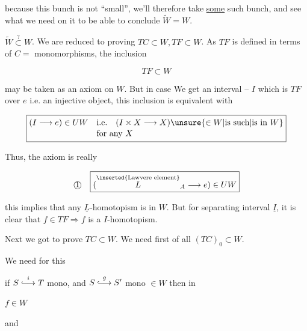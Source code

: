 

because this bunch is not ``small'', we'll therefore take \uline{some} such bunch, and see what we need on it to be able to conclude $\widetilde W=W$.

$\widetilde W\overset{?}{\subset}W$. We are reduced to proving $TC\subset W,TF\subset W$. As $TF$ is defined in terms of $C={}$ monomorphisms, the inclusion

\[\boxed{TF\subset W}\]

may be taken as an axiom on $W$. But in case We get an  interval -- $I$ which is $TF$ over $e$ i.e. an injective object,  this inclusion is equivalent with

\[\boxed{\begin{aligned}
(I\longrightarrow e)\in UW\quad&\text{i.e.}\quad(I\times X\longrightarrow X)\unsure{\in W|\text{is such}|\text{is in }W}\\[-2pt]
&\text{for any }X
\end{aligned}}\]


Thus, the axiom is really

\[
\text{\textcircled{1}}\quad\boxed{(\overset{\text{\inserted{Lawvere element}}}{L}_A\longrightarrow e)\in UW}
\]


this implies that any $\underline L$-homotopism is in $W$. But for  separating interval $\underline I$, it is clear that $f\in TF\Longrightarrow f$ is a $I$-homotopism.

Next we got to prove $TC\subset W$. We need first of all $(TC)_0\subset W$.


We need for this

if $S\overset{i}{\lhook\joinrel\longrightarrow}T$ mono, and $S\overset{g}{\lhook\joinrel\longrightarrow}S'$ mono $\in W$ then in


$f\in W$

and

